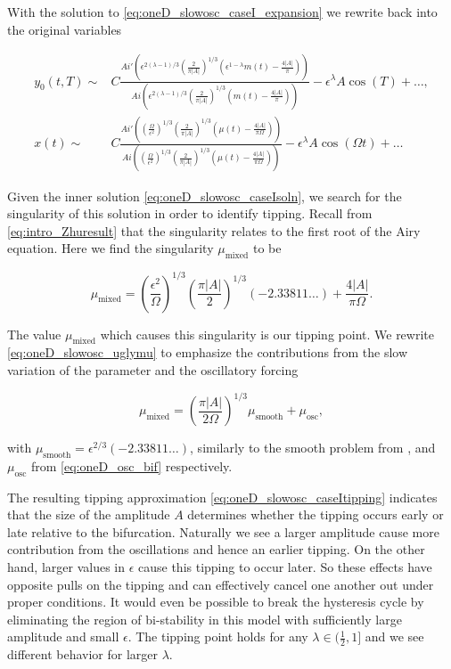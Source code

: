 With the solution to \eqref{eq:oneD_slowosc_caseI_expansion} we rewrite back into the original variables

\begin{equation}\label{eq:oneD_slowosc_caseIsoln}
\begin{aligned}
y_0(t,T)\sim& C\frac{Ai'\left(\epsilon^{2(\lambda-1)/3}\left(\frac{2}{\pi |A|}\right)^{1/3}(\epsilon^{1-\lambda}m(t)-\frac{4|A|}{\pi})\right)}{Ai\left(\epsilon^{2(\lambda-1)/3}\left(\frac{2}{\pi |A|}\right)^{1/3}(m(t)-\frac{4|A|}{\pi})\right)}-\epsilon^\lambda A\cos(T)+\ldots,\\
x(t) \sim& C\frac{Ai'\left(\left(\frac{\Omega}{\epsilon^2}\right)^{1/3}\left(\frac{2}{\pi |A|}\right)^{1/3}(\mu(t)-\frac{4|A|}{\pi \Omega})\right)}{Ai\left(\left(\frac{\Omega}{\epsilon^2}\right)^{1/3}\left(\frac{2}{\pi |A|}\right)^{1/3}(\mu(t)-\frac{4|A|}{\pi \Omega})\right)}-\epsilon^\lambda A\cos(\Omega t) +\ldots
\end{aligned}
\end{equation}

\indent Given the inner solution \eqref{eq:oneD_slowosc_caseIsoln}, we search for the singularity of this solution in order to identify tipping. Recall from \eqref{eq:intro_Zhuresult} that the singularity relates to the first root of the Airy equation. Here we find the singularity $\mu_{\text{mixed}}$ to be

\begin{equation}\label{eq:oneD_slowosc_uglymu}
\mu_{\text{mixed}}=\left(\frac{\epsilon^2}{\Omega}\right)^{1/3}\left(\frac{\pi |A|}{2}\right)^{1/3}(-2.33811\ldots)+\frac{4|A|}{\pi \Omega}.
\end{equation}

The value $\mu_{\text{mixed}}$ which causes this singularity is our tipping point. We rewrite \eqref{eq:oneD_slowosc_uglymu} to emphasize the contributions from the slow variation of the parameter and the oscillatory forcing

\begin{equation}\label{eq:oneD_slowosc_caseItipping}
\mu_{\text{mixed}} = \left(\frac{\pi |A|}{2\Omega}\right)^{1/3} \mu_{\text{smooth}}+\mu_{\text{osc}},
\end{equation}

with $\mu_{\text{smooth}}=\epsilon^{2/3}\left(-2.33811\ldots\right)$, similarly to the smooth problem from \cite{zhu2015tipping}, and $\mu_{\text{osc}}$ from \eqref{eq:oneD_osc_bif} respectively.

\indent The resulting tipping approximation \eqref{eq:oneD_slowosc_caseItipping} indicates that the size of the amplitude $A$ determines whether the tipping occurs early or late relative to the bifurcation. Naturally we see a larger amplitude cause more contribution from the oscillations and hence an earlier tipping. On the other hand, larger values in $\epsilon$ cause this tipping to occur later. So these effects have opposite pulls on the tipping and can effectively cancel one another out under proper conditions. It would even be possible to break the hysteresis cycle by eliminating the region of bi-stability in this model with sufficiently large amplitude and small $\epsilon$. The tipping point holds for any $\lambda\in (\frac{1}{2},1]$ and we see different behavior for larger $\lambda$.

